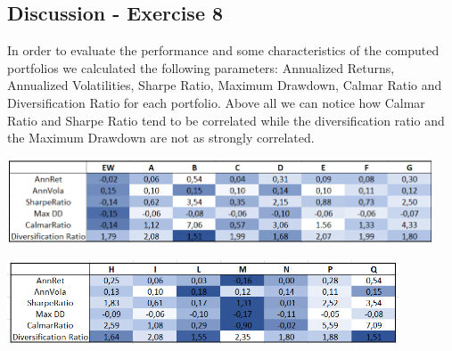 \documentclass{assignment}
\begin{document}
\subsection*{Discussion - Exercise 8}
In order to evaluate the performance and some characteristics of the computed portfolios we calculated the following parameters: Annualized Returns, Annualized Volatilities, Sharpe Ratio, Maximum Drawdown, Calmar Ratio and Diversification Ratio for each portfolio.
Above all we can notice how Calmar Ratio and Sharpe Ratio tend to be correlated while the diversification ratio and the Maximum Drawdown are not as strongly correlated.


\begin{center}
    \includegraphics[height=2.5cm]
    {assets/Blue1.png}
\end{center}

\begin{center}
    \includegraphics[height=2.5cm]
    {assets/Blue2.png}
\end{center}
\end{document}
